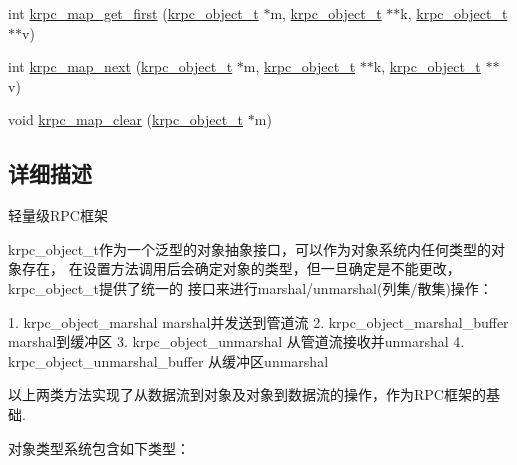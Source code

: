 \begin{DoxyCompactItemize}
\item 
int \hyperlink{group__rpc_gad894af3d72e3ae9629ebd724534dae7f}{krpc\+\_\+map\+\_\+get\+\_\+first} (\hyperlink{struct__krpc__object__t}{krpc\+\_\+object\+\_\+t} $\ast$m, \hyperlink{struct__krpc__object__t}{krpc\+\_\+object\+\_\+t} $\ast$$\ast$k, \hyperlink{struct__krpc__object__t}{krpc\+\_\+object\+\_\+t} $\ast$$\ast$v)
\item 
int \hyperlink{group__rpc_gaa818187b224d2ec13b5b1a25badc3fe3}{krpc\+\_\+map\+\_\+next} (\hyperlink{struct__krpc__object__t}{krpc\+\_\+object\+\_\+t} $\ast$m, \hyperlink{struct__krpc__object__t}{krpc\+\_\+object\+\_\+t} $\ast$$\ast$k, \hyperlink{struct__krpc__object__t}{krpc\+\_\+object\+\_\+t} $\ast$$\ast$v)
\item 
void \hyperlink{group__rpc_ga76c5ca67a568d6e6634a57c3be742b2c}{krpc\+\_\+map\+\_\+clear} (\hyperlink{struct__krpc__object__t}{krpc\+\_\+object\+\_\+t} $\ast$m)
\end{DoxyCompactItemize}


\subsection{详细描述}

\begin{DoxyPre}
轻量级RPC框架\end{DoxyPre}



\begin{DoxyPre}krpc\_object\_t作为一个泛型的对象抽象接口，可以作为对象系统内任何类型的对象存在，
在设置方法调用后会确定对象的类型，但一旦确定是不能更改，krpc\_object\_t提供了统一的
接口来进行marshal/unmarshal(列集/散集)操作：\end{DoxyPre}



\begin{DoxyPre}1. krpc\_object\_marshal          marshal并发送到管道流
2. krpc\_object\_marshal\_buffer   marshal到缓冲区
3. krpc\_object\_unmarshal        从管道流接收并unmarshal
4. krpc\_object\_unmarshal\_buffer 从缓冲区unmarshal\end{DoxyPre}



\begin{DoxyPre}以上两类方法实现了从数据流到对象及对象到数据流的操作，作为RPC框架的基础.\end{DoxyPre}



\begin{DoxyPre}对象类型系统包含如下类型：\end{DoxyPre}



